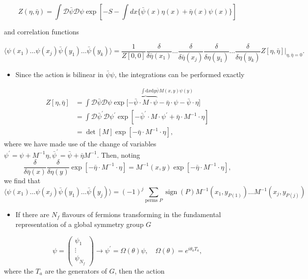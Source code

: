 \begin{equation}
Z(\eta, \bar{\eta})=\int \mathcal{D} \bar{\psi} \mathcal{D} \psi \exp \left[-S-\int d x\{\bar{\psi}(x) \eta(x)+\bar{\eta}(x) \psi(x)\}\right]
\end{equation}

and correlation functions

\begin{equation}
    \langle \psi(x_1) \ldots \psi(x_j) \bar{\psi}(y_1) \ldots \bar{\psi}(y_k)\rangle = \frac{1}{Z[0,0]}\frac{\delta}{\delta \bar{\eta}(x_1)} \ldots \frac{\delta}{\delta \bar{\eta}(x_j)}\frac{\delta}{\delta \eta(y_1)} \ldots \frac{\delta}{\delta \eta(y_k)}Z[\eta, \bar{\eta}]|_{\eta, \bar{\eta} = 0}.
\end{equation}

\begin{itemize}
  \item Since the action is bilinear in $\bar{\psi} \psi$, the integrations can be performed exactly
\end{itemize}

\begin{align}
    Z[\eta, \bar{\eta}] &= \int \mathcal{D}\bar{\psi}\mathcal{D}\psi \exp[-
    \overset{\int\text{d}x \text{d}y \bar{\psi}M(x,y)\psi(y)}{\overbrace{\bar{\psi} \cdot M \cdot \psi} - \bar{\eta}\cdot \psi - \bar{\psi} \cdot \eta]} \nonumber\\
    &= \int \mathcal{D}\bar{\psi}^\prime \mathcal{D}\psi^\prime \exp[-\bar{\psi}^\prime \cdot M \cdot \psi^\prime + \bar{\eta}\cdot M^{-1} \cdot \eta] \nonumber \\
    &= \operatorname{det}[M]\exp[-\bar{\eta}\cdot M^{-1}\cdot \eta],
\end{align}
where we have made use of the change of variables $\psi^\prime = \psi + M^{-1}\eta, \bar{\psi}^\prime = \bar{\psi} + \bar{\eta} M^{-1}$. Then, noting
\begin{equation}
    \frac{\delta}{\delta{\bar{\eta}}(x)} \frac{\delta}{\delta \eta(y)} \exp[- \bar{\eta}\cdot M^{-1}\cdot \eta] = M^{-1}(x,y)\exp[- \bar{\eta}\cdot M^{-1}\cdot \eta],
\end{equation}
we find that
\begin{equation}
    \langle \psi(x_1)\ldots\psi(x_j)\bar{\psi}(y_1)\ldots\bar{\psi}(y_j)\rangle = (-1)^j \sum_{\text{perms } P}\operatorname{sign}(P)M^{-1}(x_1, y_{P(1)})\ldots M^{-1}(x_j, y_{P(j)})
\end{equation}

\begin{itemize}
  \item If there are \(N_{f}\) flavours of fermions transforming in the fundamental representation of a global symmetry group $G$
\end{itemize}
\begin{equation}
    \psi = \begin{pmatrix}
        \psi_1 \\ \vdots \\ \psi_{N_f}
    \end{pmatrix} \rightarrow \psi^\prime = \Omega(\theta)\psi, \quad \Omega(\theta) = e^{i \theta_a T_a},
\end{equation}
where the $T_a$ are the generators of $G$, then the action

